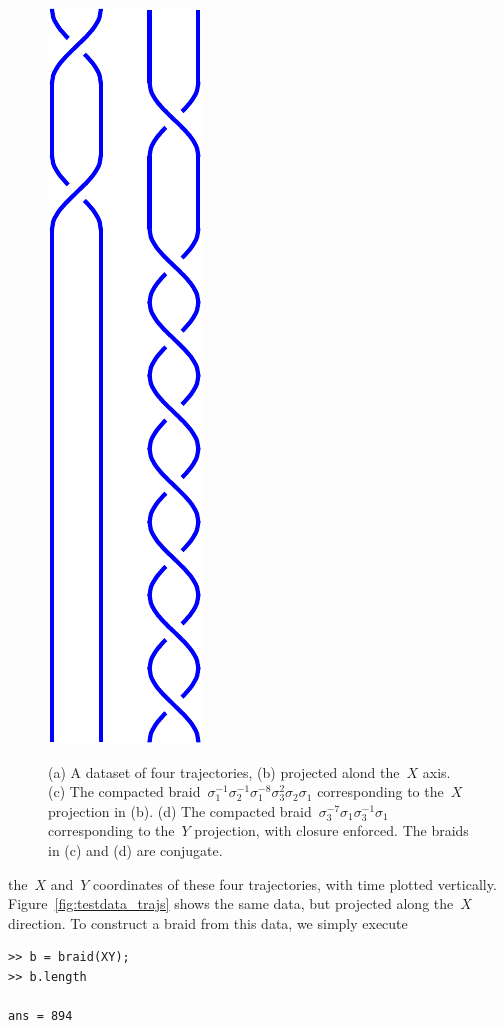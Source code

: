 \documentclass[12pt]{article}
\begin{document}
\begin{figure}
\begin{center}
{  \includegraphics[height=.3\textheight]{testdata_braidY}
  \label{fig:testdata_braidY}
}
\end{center}
\caption{(a) A dataset of four trajectories, (b) projected alond
  the~$X$ axis.  (c) The compacted braid~$ \sigma_1^{-1} \sigma_2^{-1}
  \sigma_1^{-8}\sigma_3^2\sigma_2\sigma_1$ corresponding to the~$X$
  projection in (b).  (d) The compacted
  braid~$\sigma_3^{-7}\sigma_1\sigma_3^{-1}\sigma_1$ corresponding to
  the~$Y$ projection, with closure enforced.  The braids in (c) and
  (d) are conjugate.}
\end{figure}
%
the~$X$ and~$Y$ coordinates of these four trajectories, with time
plotted vertically.  Figure~\ref{fig:testdata_trajs} shows the same
data, but projected along the~$X$ direction.  To construct a braid
from this data, we simply execute
\begin{lstlisting}[frame=single,framerule=0pt]
>> b = braid(XY);
>> b.length

ans = 894
\end{lstlisting}
\end{document}
